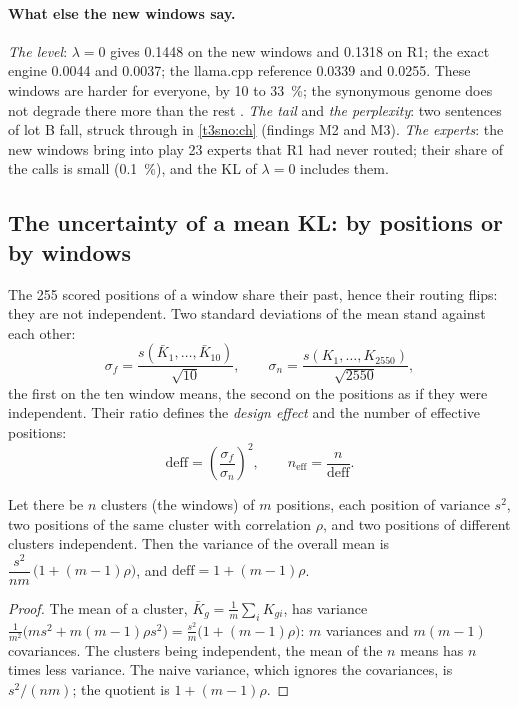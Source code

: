 \paragraph{What else the new windows say.} \emph{The level}: $\lambda = 0$ gives \num{0.1448} on the new windows and \num{0.1318} on R1; the exact engine \num{0.0044} and \num{0.0037}; the llama.cpp reference \num{0.0339} and \num{0.0255}. These windows are harder for everyone, by 10 to \SI{33}{\percent}; the synonymous genome does not degrade there more than the rest \calc. \emph{The tail} and \emph{the perplexity}: two sentences of lot B fall, struck through in \cref{t3sno:ch} (findings M2 and M3). \emph{The experts}: the new windows bring into play 23 experts that R1 had never routed; their share of the calls is small (\SI{0.1}{\percent}), and the KL of $\lambda = 0$ includes them.

\subsection{The uncertainty of a mean KL: by positions or by windows}\label{t3jug:sec:sigma}

The 255 scored positions of a window share their past, hence their routing flips: they are not independent. Two standard deviations of the mean stand against each other:
\[
\sigma_f = \frac{s(\bar K_1, \dots, \bar K_{10})}{\sqrt{10}},
\qquad
\sigma_n = \frac{s(K_1, \dots, K_{\num{2550}})}{\sqrt{\num{2550}}},
\]
the first on the ten window means, the second on the positions as if they were independent. Their ratio defines the \emph{design effect} and the number of effective positions:
\[
\mathrm{deff} = \left(\frac{\sigma_f}{\sigma_n}\right)^2,\qquad n_{\text{eff}} = \frac{n}{\mathrm{deff}} .
\]

\begin{proposition}\label{t3jug:prop:deff}
Let there be $n$ clusters (the windows) of $m$ positions, each position of variance $s^2$, two positions of the same cluster with correlation $\rho$, and two positions of different clusters independent. Then the variance of the overall mean is $\dfrac{s^2}{nm}\,\bigl(1 + (m - 1)\rho\bigr)$, and $\mathrm{deff} = 1 + (m - 1)\rho$.
\end{proposition}
\begin{proof}
The mean of a cluster, $\bar K_g = \frac1m \sum_{i} K_{gi}$, has variance $\frac{1}{m^2}\bigl(m s^2 + m(m-1)\rho s^2\bigr) = \frac{s^2}{m}\bigl(1 + (m-1)\rho\bigr)$: $m$ variances and $m(m-1)$ covariances. The clusters being independent, the mean of the $n$ means has $n$ times less variance. The naive variance, which ignores the covariances, is $s^2/(nm)$; the quotient is $1 + (m-1)\rho$.
\end{proof}

